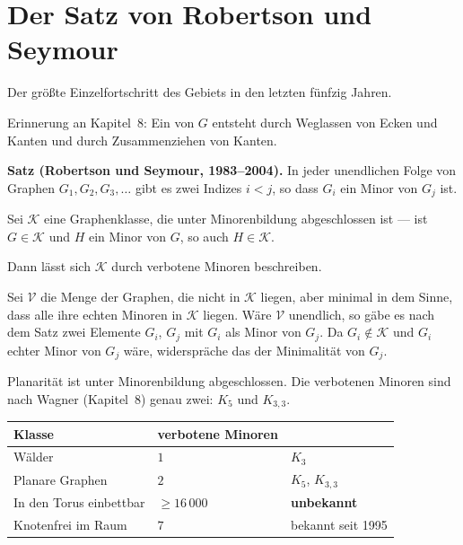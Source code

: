 \section{Der Satz von Robertson und Seymour}

Der größte Einzelfortschritt des Gebiets in den letzten fünfzig Jahren.

\begin{merksatz}
Erinnerung an Kapitel~8: Ein  von $G$ entsteht durch Weglassen von Ecken und Kanten und durch Zusammenziehen von Kanten.

\textbf{Satz (Robertson und Seymour, 1983--2004).} In jeder unendlichen Folge von Graphen $G_1, G_2, G_3, \ldots$ gibt es zwei Indizes $i < j$, so dass $G_i$ ein Minor von $G_j$ ist.
\end{merksatz}

\begin{merksatz}
Sei $\mathcal{K}$ eine Graphenklasse, die unter Minorenbildung abgeschlossen ist --- ist $G \in \mathcal{K}$ und $H$ ein Minor von $G$, so auch $H \in \mathcal{K}$.

Dann lässt sich $\mathcal{K}$ durch  verbotene Minoren beschreiben.

Sei $\mathcal{V}$ die Menge der Graphen, die nicht in $\mathcal{K}$ liegen, aber minimal in dem Sinne, dass alle ihre echten Minoren in $\mathcal{K}$ liegen. Wäre $\mathcal{V}$ unendlich, so gäbe es nach dem Satz zwei Elemente $G_i$, $G_j$ mit $G_i$ als Minor von $G_j$. Da $G_i \notin \mathcal{K}$ und $G_i$ echter Minor von $G_j$ wäre, widerspräche das der Minimalität von $G_j$.

Planarität ist unter Minorenbildung abgeschlossen. Die verbotenen Minoren sind nach Wagner (Kapitel~8) genau zwei: $K_5$ und $K_{3,3}$.

\begin{center}
{\small
\renewcommand{\arraystretch}{1.45}
\begin{tabular}{@{}P{2.8cm}P{2.4cm}P{3.0cm}@{}}
\toprule
\textbf{Klasse} & \textbf{verbotene Minoren} & \\
\midrule
Wälder & $1$ & $K_3$\\
Planare Graphen & $2$ & $K_5$, $K_{3,3}$\\
In den Torus einbettbar & $\ge 16\,000$ & \textcolor{akzent}{\textbf{unbekannt}}\\
Knotenfrei im Raum & $7$ & bekannt seit 1995\\
\bottomrule
\end{tabular}}
\end{center}
\end{merksatz}

